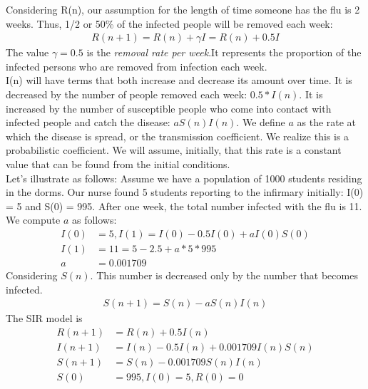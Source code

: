 \documentclass[a4paper]{article}
\begin{document}
        \indent Considering R(n), our assumption for the length of time someone has the flu is 2 weeks. Thus, 1/2 or 50\% of the infected people will be removed each week:
        \begin{align*}
            R(n+1) = R(n) + \gamma I= R(n) + 0.5I
        \end{align*}
        \indent The value $\gamma = 0.5$ is the \textit{removal rate per week}.It represents the proportion of the infected persons who are removed from infection each week. \\
        \indent I(n) will have terms that both increase and decrease its amount over time. It is decreased by the number of people removed each week: $0.5 * I(n)$. It is increased by the number of susceptible people who come into contact with infected people and catch the disease: $aS(n)I(n)$. We define $a$ as the rate at which the disease is spread, or the transmission coefficient. We realize this is a probabilistic coefficient. We will assume, initially, that this rate is a constant value that can be found from the initial conditions.\\
        \indent Let’s illustrate as follows: Assume we have a population of 1000 students residing in the dorms. Our nurse found 5 students reporting to the infirmary initially: I(0) = 5 and S(0) = 995. After one week, the total number infected with the flu is 11. We compute $a$ as follows:
        \begin{align*}
            I(0) & = 5, I(1) = I(0) - 0.5 I(0) + a I(0) S(0) \\
            I(1) & = 11 = 5 - 2.5 + a*5*995 \\
            a & = 0.001709
        \end{align*}  
        \indent Considering $S(n)$. This number is decreased only by the number that becomes infected.
        \begin{align*}
            S(n+1) = S(n) - a S(n) I(n)
        \end{align*}
        The SIR model is
        \begin{align*}
            R(n+1) & = R(n) + 0.5 I(n) \\
            I(n+1) & = I(n) - 0.5 I(n) + 0.001709 I(n) S(n) \\
            S(n+1) & = S(n) - 0.001709 S(n) I(n) \\
            S(0) & = 995,I(0) = 5,R(0) = 0 
        \end{align*}
        
\end{document}

